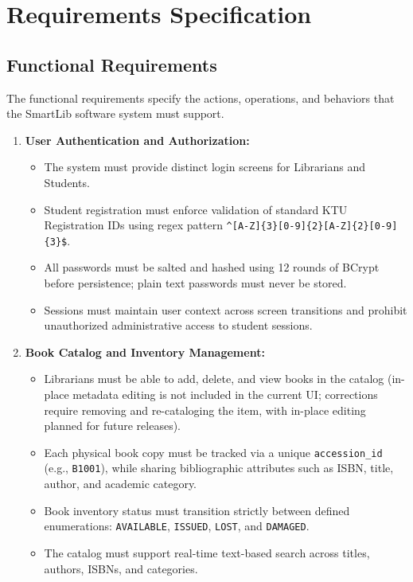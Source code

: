 \chapter{Requirements Specification}

\section{Functional Requirements}
The functional requirements specify the actions, operations, and behaviors that the SmartLib software system must support.

\begin{enumerate}[label=\textbf{FR-\arabic*:}, leftmargin=2.5cm]
    \item \textbf{User Authentication and Authorization:}
    \begin{itemize}
        \item The system must provide distinct login screens for Librarians and Students.
        \item Student registration must enforce validation of standard KTU Registration IDs using regex pattern \texttt{\^{}[A-Z]\{3\}[0-9]\{2\}[A-Z]\{2\}[0-9]\{3\}\$}.
        \item All passwords must be salted and hashed using 12 rounds of BCrypt before persistence; plain text passwords must never be stored.
        \item Sessions must maintain user context across screen transitions and prohibit unauthorized administrative access to student sessions.
    \end{itemize}

    \item \textbf{Book Catalog and Inventory Management:}
    \begin{itemize}
        \item Librarians must be able to add, delete, and view books in the catalog (in-place metadata editing is not included in the current UI; corrections require removing and re-cataloging the item, with in-place editing planned for future releases).
        \item Each physical book copy must be tracked via a unique \texttt{accession\_id} (e.g., \texttt{B1001}), while sharing bibliographic attributes such as ISBN, title, author, and academic category.
        \item Book inventory status must transition strictly between defined enumerations: \texttt{AVAILABLE}, \texttt{ISSUED}, \texttt{LOST}, and \texttt{DAMAGED}.
        \item The catalog must support real-time text-based search across titles, authors, ISBNs, and categories.
    \end{itemize}


\end{enumerate}
